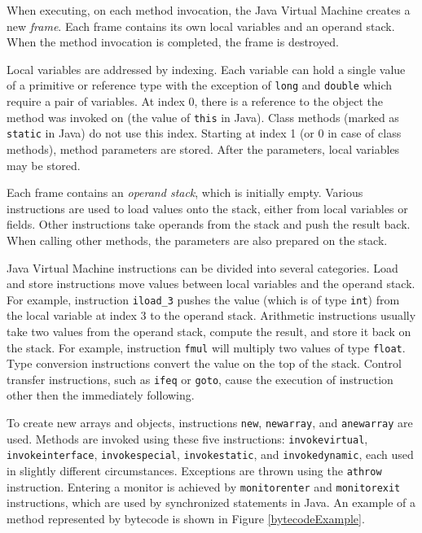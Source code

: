 When executing, on each method invocation, the Java Virtual Machine creates a
new \emph{frame}. Each frame contains its own local variables and an operand
stack. When the method invocation is completed, the frame is destroyed.

Local variables are addressed by indexing. Each variable can hold a single value
of a primitive or reference type with the exception of \texttt{long} and
\texttt{double} which require a pair of variables. At index 0, there is a
reference to the object the method was invoked on (the value of \texttt{this} in
Java). Class methods (marked as \texttt{static} in Java) do not use this index.
Starting at index 1 (or 0 in case of class methods), method parameters are
stored. After the parameters, local variables may be stored.

Each frame contains an \emph{operand stack}, which is initially empty. Various
instructions are used to load values onto the stack, either from local variables
or fields. Other instructions take operands from the stack and push the result
back. When calling other methods, the parameters are also prepared on the stack.

Java Virtual Machine instructions can be divided into several categories. Load
and store instructions move values between local variables and the operand
stack. For example, instruction \texttt{iload\_3} pushes the value (which is of
type \texttt{int}) from the local variable at index 3 to the operand stack.
Arithmetic instructions usually take two values from the operand stack, compute
the result, and store it back on the stack. For example, instruction
\texttt{fmul} will multiply two values of type \texttt{float}. Type conversion
instructions convert the value on the top of the stack. Control transfer
instructions, such as \texttt{ifeq} or \texttt{goto}, cause the execution of
instruction other then the immediately following.

To create new arrays and objects, instructions \texttt{new}, \texttt{newarray},
and \texttt{anewarray} are used. Methods are invoked using these five
instructions: \texttt{invokevirtual}, \texttt{invokeinterface},
\texttt{invokespecial}, \texttt{invokestatic}, and \texttt{invokedynamic}, each
used in slightly different circumstances. Exceptions are thrown using the
\texttt{athrow} instruction. Entering a monitor is achieved by
\texttt{monitorenter} and \texttt{monitorexit} instructions, which are used by
synchronized statements in Java. An example of a method represented by bytecode
is shown in Figure \ref{bytecodeExample}.

